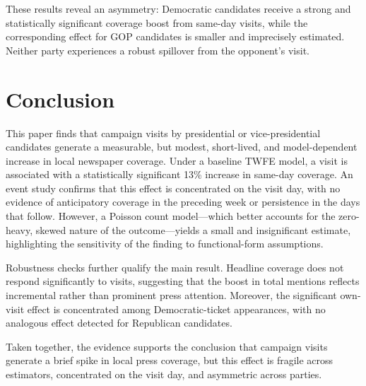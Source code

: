 \documentclass{article}
\begin{document}
These results reveal an asymmetry: Democratic candidates receive a strong and statistically
significant coverage boost from same-day visits, while the corresponding effect for GOP
candidates is smaller and imprecisely estimated.
Neither party experiences a robust spillover from the opponent's visit.

\begin{table}[H]
\centering
\caption{Opponent and spillover effects: GOP coverage model}
\label{tab:opp_gop}

\end{table}

\begin{table}[H]
\centering
\caption{Opponent and spillover effects: DEM coverage model}
\label{tab:opp_dem}

\end{table}


\section{Conclusion}

This paper finds that campaign visits by presidential or vice-presidential candidates
generate a measurable, but modest, short-lived, and model-dependent increase in local
newspaper coverage.
Under a baseline TWFE model, a visit is associated with a statistically significant 13\%
increase in same-day coverage.
An event study confirms that this effect is concentrated on the visit day, with no evidence
of anticipatory coverage in the preceding week or persistence in the days that follow.
However, a Poisson count model---which better accounts for the zero-heavy, skewed nature of
the outcome---yields a small and insignificant estimate, highlighting the sensitivity of
the finding to functional-form assumptions.

Robustness checks further qualify the main result.
Headline coverage does not respond significantly to visits, suggesting that the boost in
total mentions reflects incremental rather than prominent press attention.
Moreover, the significant own-visit effect is concentrated among Democratic-ticket
appearances, with no analogous effect detected for Republican candidates.

Taken together, the evidence supports the conclusion that campaign visits generate a brief
spike in local press coverage, but this effect is fragile across estimators, concentrated
on the visit day, and asymmetric across parties.
\end{document}
